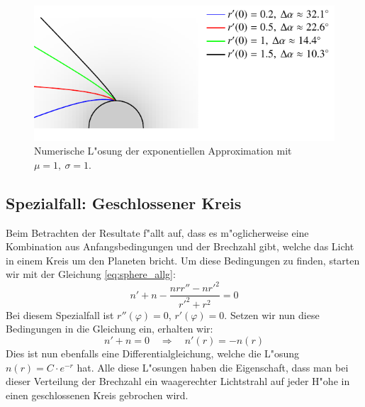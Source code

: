 \begin{refsection}
\begin{figure}
\centering
\includegraphics[scale=1]{licht/standalone/fig_sphere_simulation2.pdf}
\caption{Numerische L"osung der exponentiellen Approximation mit $\mu = 1, \: \sigma = 1$. \label{fig:sphaerisches_modell3} }
\end{figure}

\newpage

\subsection{Spezialfall: Geschlossener Kreis}
Beim Betrachten der Resultate f"allt auf, dass es m"oglicherweise eine Kombination aus Anfangsbedingungen und der Brechzahl gibt, welche das Licht in einem Kreis um den Planeten bricht. 
Um diese Bedingungen zu finden, starten wir mit der Gleichung \ref{eq:sphere_allg}:
$$ n' + n - \frac{n r r'' - n r'^2}{r'^2 + r^2} = 0$$
Bei diesem Spezialfall ist $r''(\varphi) = 0$, $r'(\varphi) = 0$. 
Setzen wir nun diese Bedingungen in die Gleichung ein, erhalten wir:
$$n' + n = 0 \quad \Rightarrow \quad n'(r) = -n(r)$$
Dies ist nun ebenfalls eine Differentialgleichung, welche die L"osung $n(r) = C \cdot e^{-r}$ hat.
Alle diese L"osungen haben die Eigenschaft, dass man bei dieser Verteilung der Brechzahl ein waagerechter Lichtstrahl auf jeder H"ohe in einen geschlossenen Kreis gebrochen wird.


\end{refsection}
